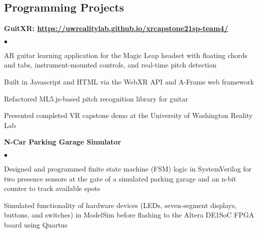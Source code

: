 \documentclass[margin,line]{res}
\newenvironment{list2}{
  \begin{list}{$\bullet$}{%
      \setlength{\itemsep}{0in}
      \setlength{\parsep}{0in} \setlength{\parskip}{0in}
      \setlength{\topsep}{0in} \setlength{\partopsep}{0in} 
      \setlength{\leftmargin}{0.2in}}}{\end{list}}
\begin{document}
\begin{resume}
\section{\sc Programming Projects}

{\bf GuitXR: \url{https://uwrealitylab.github.io/xrcapstone21sp-team4/}} %
\begin{list2}
\item AR guitar learning application for the Magic Leap headset with floating chords and tabs, instrument-mounted controls, and real-time pitch detection
\item Built in Javascript and HTML via the WebXR API and A-Frame web framework
\item Refactored ML5.js-based pitch recognition library for guitar 
\item Presented completed VR capstone demo at the University of Washington Reality Lab
\end{list2}

{\bf N-Car Parking Garage Simulator}
\begin{list2}
\item Designed and programmed finite state machine (FSM) logic in SystemVerilog for two presence sensors at the gate of a simulated parking garage and an n-bit counter to track available spots
\item Simulated functionality of hardware devices (LEDs, seven-segment displays, buttons, and switches) in ModelSim before flashing to the Altera DE1{\textunderscore}SoC FPGA board using Quartus
\end{list2}


\end{resume}
\end{document}
